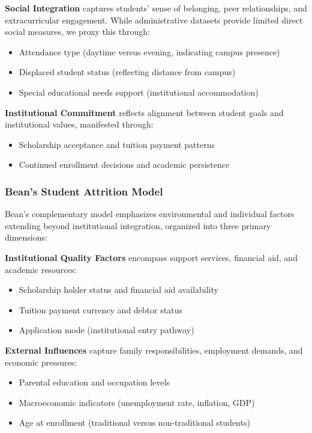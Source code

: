 \textbf{Social Integration} captures students' sense of belonging, peer relationships, and extracurricular engagement. While administrative datasets provide limited direct social measures, we proxy this through:
\begin{itemize}
\item Attendance type (daytime versus evening, indicating campus presence)
\item Displaced student status (reflecting distance from campus)
\item Special educational needs support (institutional accommodation)
\end{itemize}

\textbf{Institutional Commitment} reflects alignment between student goals and institutional values, manifested through:
\begin{itemize}
\item Scholarship acceptance and tuition payment patterns
\item Continued enrollment decisions and academic persistence
\end{itemize}

\subsubsection{Bean's Student Attrition Model}

Bean's complementary model \cite{Bean1985} emphasizes environmental and individual factors extending beyond institutional integration, organized into three primary dimensions:

\textbf{Institutional Quality Factors} encompass support services, financial aid, and academic resources:
\begin{itemize}
\item Scholarship holder status and financial aid availability
\item Tuition payment currency and debtor status
\item Application mode (institutional entry pathway)
\end{itemize}

\textbf{External Influences} capture family responsibilities, employment demands, and economic pressures:
\begin{itemize}
\item Parental education and occupation levels
\item Macroeconomic indicators (unemployment rate, inflation, GDP)
\item Age at enrollment (traditional versus non-traditional students)
\end{itemize}


